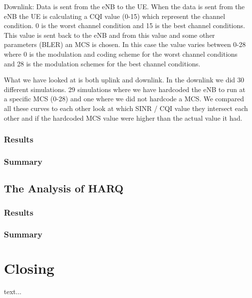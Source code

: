 \documentclass[cropmarks, frame, english]{idamasterthesis}
\begin{document}
Downlink: \newline
Data is sent from the eNB to the UE. When the data is sent from the eNB the UE is calculating a CQI value (0-15) which represent the channel condition. 0 is the worst channel condition and 15 is the best channel conditions. This value is sent back to the eNB and from this value and some other parameters (BLER) an MCS is chosen. In this case the value varies between 0-28 where 0 is the modulation and coding scheme for the worst channel conditions and 28 is the modulation schemes for the best channel conditions.

What we have looked at is both uplink and downlink. In the downlink we did 30 different simulations. 29 simulations where we have hardcoded the eNB to run at a specific MCS (0-28) and one where we did not hardcode a MCS. We compared all these curves to each other look at which SINR / CQI value they intersect each other and if the hardcoded MCS value were higher than the actual value it had.

\subsection{Results}

\subsection{Summary}


\section{The Analysis of HARQ}

\subsection{Results}

\subsection{Summary}





\chapter{Closing}

text...
\end{document}
